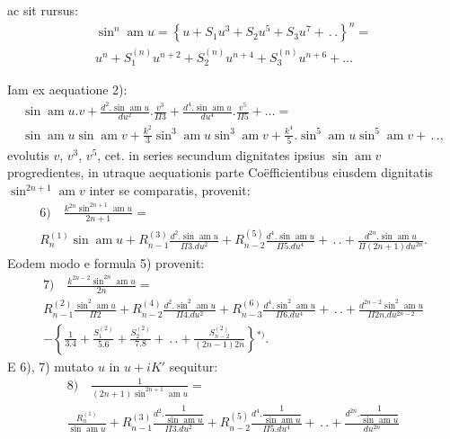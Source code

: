 \documentclass{article}
\begin{document}
ac sit rursus:
\[
\begin{gathered}
\sin^{n}\operatorname{am}u=\left\{u+S_{1}u^{3}+S_{2}u^{5}+S_{3}u^{7}+\,.\,.\right\}^{n}=\\[1.5ex]
u^{n}+S_{1}^{(n)}u^{n+2}+S_{2}^{(n)}u^{n+4}+S_{3}^{(n)}u^{n+6}+\ldots
\end{gathered}
\]

Iam ex aequatione 2):
\[
\begin{gathered}
\sin\operatorname{am}u.v+\frac{d^{2}.\sin\operatorname{am}u}{du^{2}}.\frac{v^{3}}{\Pi 3}+\frac{d^{4}.\sin\operatorname{am}u}{du^{4}}.\frac{v^{5}}{\Pi 5}+\ldots=\\[1.5ex]
\sin\operatorname{am}u\sin\operatorname{am}v+\frac{k^{2}}{3}\sin^{3}\operatorname{am}u\sin^{3}\operatorname{am}v+\frac{k^{4}}{5}.\sin^{5}\operatorname{am}u\sin^{5}\operatorname{am}v+\,.\,.,
\end{gathered}
\]
evolutis $v$, $v^{3}$, $v^{5}$, cet. in series secundum dignitates ipsius $\sin\operatorname{am}v$ progredientes, in utraque aequationis parte Coëfficientibus eiusdem dignitatis $\sin^{2n+1}\operatorname{am}v$ inter se comparatis, provenit:
\[
\begin{gathered}
\text{6)}\quad\frac{k^{2n}\sin^{2n+1}\operatorname{am}u}{2n+1}=\\[1.5ex]
R_{n}^{(1)}\sin\operatorname{am}u+R_{n-1}^{(3)}\frac{d^{2}.\sin\operatorname{am}u}{\Pi 3.du^{2}}+R_{n-2}^{(5)}\frac{d^{4}.\sin\operatorname{am}u}{\Pi 5.du^{4}}+\,.\,.+\frac{d^{2n}.\sin\operatorname{am}u}{\Pi(2n+1)du^{2n}}.
\end{gathered}
\]
Eodem modo e formula 5) provenit:
\[
\begin{gathered}
\text{7)}\quad\frac{k^{2n-2}\sin^{2n}\operatorname{am}u}{2n}=\\[1.5ex]
R_{n-1}^{(2)}\frac{\sin^{2}\operatorname{am}u}{\Pi 2}+R_{n-2}^{(4)}\frac{d^{2}.\sin^{2}\operatorname{am}u}{\Pi 4.du^{2}}+R_{n-3}^{(6)}\frac{d^{4}.\sin^{2}\operatorname{am}u}{\Pi 6.du^{4}}+\,.\,.+\frac{d^{2n-2}\sin^{2}\operatorname{am}u}{\Pi 2n.du^{2n-2}}\\[1.5ex]
-\left\{\frac{1}{3.4}+\frac{S_{1}^{(2)}}{5.6}+\frac{S_{2}^{(2)}}{7.8}+\,.\,.+\frac{S_{n-2}^{(2)}}{(2n-1)2n}\right\}{}^{*)}.
\end{gathered}
\]
E 6), 7) mutato $u$ in $u+iK'$ sequitur:
\[
\begin{gathered}
\text{8)}\quad\frac{1}{(2n+1)\sin^{2n+1}\operatorname{am}u}=\\[1.5ex]
\frac{R_{n}^{(1)}}{\sin\operatorname{am}u}+R_{n-1}^{(3)}\frac{d^{2}.\dfrac{1}{\sin\operatorname{am}u}}{\Pi 3.du^{2}}+R_{n-2}^{(5)}\frac{d^{4}.\dfrac{1}{\sin\operatorname{am}u}}{\Pi 5.du^{4}}+\,.\,.+\frac{d^{2n}.\dfrac{1}{\sin\operatorname{am}u}}{du^{2n}}
\end{gathered}
\]
\end{document}
